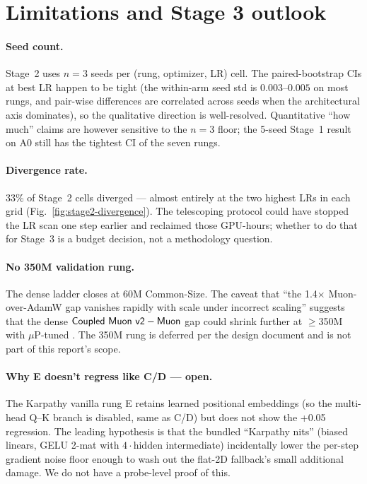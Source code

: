 \section{Limitations and Stage 3 outlook}\label{sec:limits}

\paragraph{Seed count.}
Stage~2 uses $n{=}3$ seeds per (rung, optimizer, LR) cell. The paired-bootstrap CIs at best LR happen to be tight (the within-arm seed std is $0.003$--$0.005$\nats{} on most rungs, and pair-wise differences are correlated across seeds when the architectural axis dominates), so the qualitative direction is well-resolved. Quantitative ``how much'' claims are however sensitive to the $n{=}3$ floor; the 5-seed Stage~1 result on A0 still has the tightest CI of the seven rungs.

\paragraph{Divergence rate.}
33\% of Stage~2 cells diverged --- almost entirely at the two highest LRs in each grid (Fig.~\ref{fig:stage2-divergence}). The telescoping protocol could have stopped the LR scan one step earlier and reclaimed those GPU-hours; whether to do that for Stage~3 is a budget decision, not a methodology question.

\paragraph{No 350M validation rung.}
The dense ladder closes at 60M Common-Size. The \citet{qiu2025hp} caveat that ``the 1.4$\times$ Muon-over-AdamW gap vanishes rapidly with scale under incorrect scaling'' suggests that the dense $\textsf{Coupled Muon v2} - \textsf{Muon}$ gap could shrink further at $\geq$350M with $\mu$P-tuned \optAdamW. The 350M rung is deferred per the design document and is not part of this report's scope.

\paragraph{Why E doesn't regress like C/D --- open.}
The Karpathy vanilla rung E retains learned positional embeddings (so the multi-head Q--K branch is disabled, same as C/D) but does not show the +0.05\nats{} regression. The leading hypothesis is that the bundled ``Karpathy nits'' (biased linears, GELU 2-mat with $4\cdot$hidden intermediate) incidentally lower the per-step gradient noise floor enough to wash out the flat-2D fallback's small additional damage. We do not have a probe-level proof of this.


